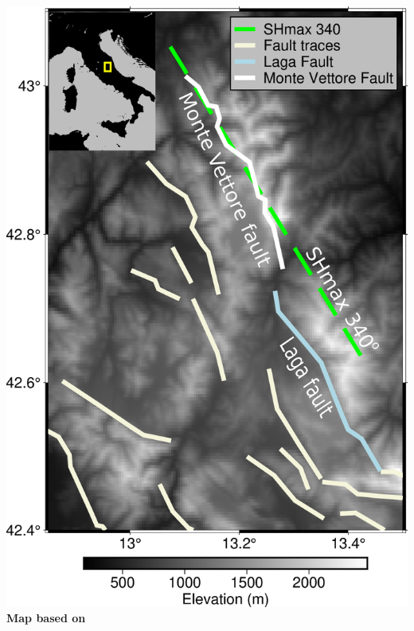 \documentclass{beamer}
\begin{document}
\begin{frame}
\begin{center}
\begin{center}
\begin{minipage}{0.33\linewidth}
  \includegraphics[width=1\linewidth]{images/Map_Italy.png}  
  \vskip 0.2cm
  {\bf \tiny Map based on \cite{Walker_2021_FAULT2SHA}} \end{minipage}
 \end{center}
 \end{center}
  \addtocounter{framenumber}{-1}
  
\end{frame}
\end{document}
